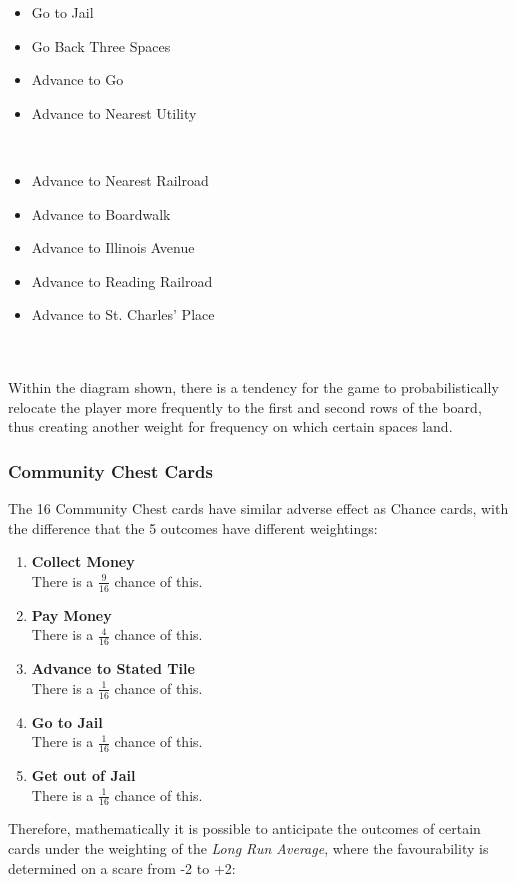 \documentclass[12pt]{article}
\begin{document}
\begin{minipage}{0.5\textwidth}
\begin{flushleft}
\begin{itemize}
  \item {Go to Jail}
  \item {Go Back Three Spaces}
  \item {Advance to Go}
  \item {Advance to Nearest Utility}
\end{itemize}
\end{flushleft}
\end{minipage}
~
\begin{minipage}{0.5\textwidth}
\begin{flushleft} 
\begin{itemize}
  \item {Advance to Nearest Railroad}
  \item {Advance to Boardwalk}
  \item {Advance to Illinois Avenue}
  \item {Advance to Reading Railroad}
  \item {Advance to St. Charles' Place}
\end{itemize}
\end{flushleft}
\end{minipage}
\\
\\
Within the diagram shown, there is a tendency for the game to probabilistically relocate the player more frequently to the first and second rows of the board, thus creating another weight for frequency on which certain spaces land.

\subsubsection{Community Chest Cards}
\label{Community Chest Probabilities}
The 16 Community Chest cards have similar adverse effect as Chance cards, with the difference that the 5 outcomes have different weightings:
\begin{enumerate}
  \item \textbf{Collect Money} \hfill\\
  There is a $\frac{9}{16}$ chance of this.
  \item \textbf{Pay Money} \hfill\\
  There is a $\frac{4}{16}$ chance of this.
  \item \textbf{Advance to Stated Tile} \hfill\\
  There is a $\frac{1}{16}$ chance of this.
  \item \textbf{Go to Jail} \hfill\\
  There is a $\frac{1}{16}$ chance of this.
  \item \textbf{Get out of Jail} \hfill\\
  There is a $\frac{1}{16}$ chance of this.
\end{enumerate}
Therefore, mathematically it is possible to anticipate the outcomes of certain cards under the weighting of the \emph{Long Run Average}, where the favourability is determined on a scare from -2 to +2:
\end{document}
